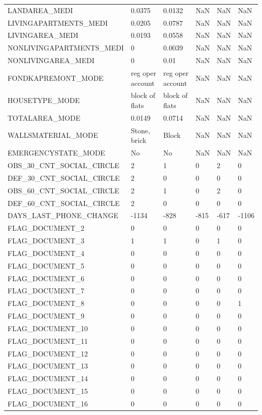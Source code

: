 \documentclass[12pt, letterpaper]{article}
\begin{document}
\begin{appendices}
{\begin{longtable}[c]{| l || p{2cm} | p{2cm} | p{2cm} | p{2cm} | p{2cm} |}
LANDAREA_MEDI	&	0.0375	&	0.0132	&	NaN	&	NaN	&	NaN	\\
LIVINGAPARTMENTS_MEDI	&	0.0205	&	0.0787	&	NaN	&	NaN	&	NaN	\\
LIVINGAREA_MEDI	&	0.0193	&	0.0558	&	NaN	&	NaN	&	NaN	\\
NONLIVINGAPARTMENTS_MEDI	&	0	&	0.0039	&	NaN	&	NaN	&	NaN	\\
NONLIVINGAREA_MEDI	&	0	&	0.01	&	NaN	&	NaN	&	NaN	\\
FONDKAPREMONT_MODE	&	reg oper account	&	reg oper account	&	NaN	&	NaN	&	NaN	\\
HOUSETYPE_MODE	&	block of flats	&	block of flats	&	NaN	&	NaN	&	NaN	\\
TOTALAREA_MODE	&	0.0149	&	0.0714	&	NaN	&	NaN	&	NaN	\\
WALLSMATERIAL_MODE	&	Stone, brick	&	Block	&	NaN	&	NaN	&	NaN	\\
EMERGENCYSTATE_MODE	&	No	&	No	&	NaN	&	NaN	&	NaN	\\
OBS_30_CNT_SOCIAL_CIRCLE	&	2	&	1	&	0	&	2	&	0	\\
DEF_30_CNT_SOCIAL_CIRCLE	&	2	&	0	&	0	&	0	&	0	\\
OBS_60_CNT_SOCIAL_CIRCLE	&	2	&	1	&	0	&	2	&	0	\\
DEF_60_CNT_SOCIAL_CIRCLE	&	2	&	0	&	0	&	0	&	0	\\
DAYS_LAST_PHONE_CHANGE	&	-1134	&	-828	&	-815	&	-617	&	-1106	\\
FLAG_DOCUMENT_2	&	0	&	0	&	0	&	0	&	0	\\
FLAG_DOCUMENT_3	&	1	&	1	&	0	&	1	&	0	\\
FLAG_DOCUMENT_4	&	0	&	0	&	0	&	0	&	0	\\
FLAG_DOCUMENT_5	&	0	&	0	&	0	&	0	&	0	\\
FLAG_DOCUMENT_6	&	0	&	0	&	0	&	0	&	0	\\
FLAG_DOCUMENT_7	&	0	&	0	&	0	&	0	&	0	\\
FLAG_DOCUMENT_8	&	0	&	0	&	0	&	0	&	1	\\
FLAG_DOCUMENT_9	&	0	&	0	&	0	&	0	&	0	\\
FLAG_DOCUMENT_10	&	0	&	0	&	0	&	0	&	0	\\
FLAG_DOCUMENT_11	&	0	&	0	&	0	&	0	&	0	\\
FLAG_DOCUMENT_12	&	0	&	0	&	0	&	0	&	0	\\
FLAG_DOCUMENT_13	&	0	&	0	&	0	&	0	&	0	\\
FLAG_DOCUMENT_14	&	0	&	0	&	0	&	0	&	0	\\
FLAG_DOCUMENT_15	&	0	&	0	&	0	&	0	&	0	\\
FLAG_DOCUMENT_16	&	0	&	0	&	0	&	0	&	0	\\

\end{longtable}}
\end{appendices}
\end{document}
